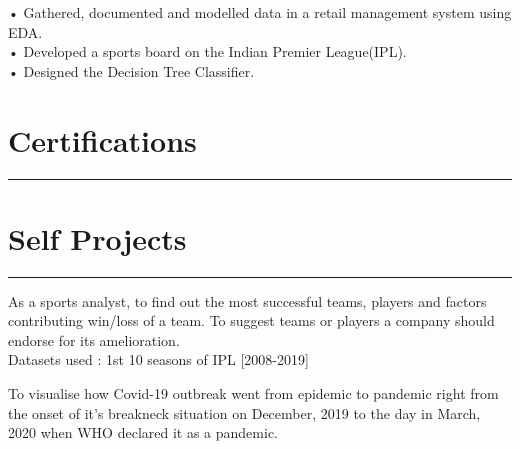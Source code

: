 \documentclass[]{DD_Resume_21}
\begin{document}
\begin{minipage}[t]{0.66\textwidth}
 
\noindent
\hspace{5em}%
\begin{minipage}{0.85\textwidth\vspace{2pt}}
• Gathered, documented and modelled data in a retail management system using EDA.\\
• Developed a sports board on the Indian Premier League(IPL).\\
• Designed the Decision Tree Classifier.
\end{minipage}
\section{Certifications} 
\noindent\rule{12.5cm}{0.4pt}
 
\noindent
\hspace{5em}%
 
\noindent
\hspace{5em}%
\hspace{5em}%
 
\noindent
\hspace{5em}%
\section{Self Projects}
\noindent\rule{12.5cm}{0.4pt}
 
\noindent
\hspace{5em}%
\begin{minipage}{0.85\textwidth\vspace{5pt}}
As a sports analyst, to find out the most successful teams, players and factors contributing win/loss of a team. To suggest teams or players a company should endorse for its amelioration.\\
Datasets used : 1st 10 seasons of IPL [2008-2019]
\end{minipage}
 
\noindent
\hspace{5em}%
\begin{minipage}{0.85\textwidth\vspace{5pt}}
To visualise how Covid-19 outbreak went from epidemic to pandemic right from the onset of it's breakneck situation on December, 2019 to the day in March, 2020 when WHO declared it as a pandemic.
\end{minipage}
\end{minipage} 
\end{document}
